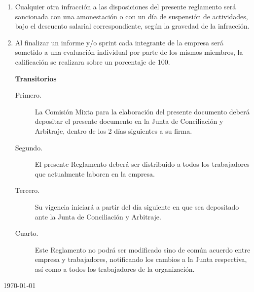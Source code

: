 \documentclass[11pt,letterpaper]{report}
\begin{document}
\begin{enumerate}
\item Cualquier otra infracción a las disposiciones del presente reglamento será sancionada con una amonestación o con un día de suspensión de actividades, bajo el descuento salarial correspondiente, según la gravedad de la infracción.
\item Al finalizar un informe y/o sprint cada integrante de la empresa será sometido a una evaluación individual por parte de los mismos miembros, la calificación se realizara sobre un porcentaje de 100.
\begin{center}
{\bf Transitorios}
\end{center}
\begin{description}
\item[Primero.] La Comisión Mixta para la elaboración del presente documento deberá depositar el presente documento en la Junta de Conciliación y Arbitraje, dentro de los 2 días siguientes a su firma.
\item[Segundo.] El presente Reglamento deberá ser distribuido a todos los trabajadores que actualmente laboren en la empresa.
\item[Tercero.] Su vigencia iniciará a partir del día siguiente en que sea depositado ante la Junta de Conciliación y Arbitraje.
\item[Cuarto.] Este Reglamento no podrá ser modificado sino de común acuerdo entre empresa y trabajadores, notificando los cambios a la Junta respectiva, así como a todos los trabajadores de la organización.
\end{description}
\end{enumerate}
\begin{flushright}
\today
\end{flushright}
\end{document}
